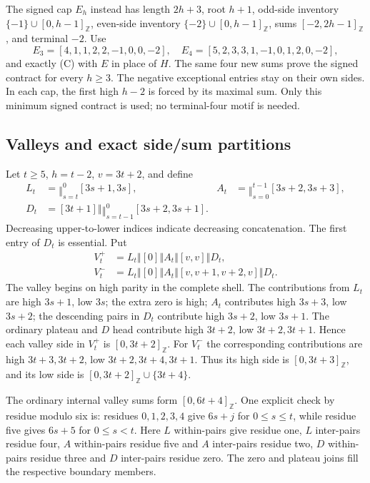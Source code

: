\documentclass[11pt,a4paper]{article}
\theoremstyle{definition}\newtheorem{definition}[theorem]{Definition}
\theoremstyle{remark}\newtheorem{remark}[theorem]{Remark}
\newcommand{\cat}{\mathbin{\Vert}}
\newcommand{\ints}[2]{[#1,#2]_{\mathbb Z}}
\begin{document}
The signed cap $E_h$ instead has length $2h+3$, root $h+1$, odd-side
inventory $\{-1\}\cup\ints0{h-1}$, even-side inventory
$\{-2\}\cup\ints0{h-1}$, sums $\ints{-2}{2h-1}$, and terminal $-2$.
Use
\[
 E_3=[4,1,1,2,2,-1,0,0,-2],\quad
 E_4=[5,2,3,3,1,-1,0,1,2,0,-2],
\]
and exactly (C) with $E$ in place of $H$. The same four new sums
prove the signed contract for every $h\ge3$. The negative exceptional
entries stay on their own sides. In each cap, the first high $h-2$ is
forced by its maximal sum. Only this minimum signed contract is used;
no terminal-four motif is needed.

\subsection{Valleys and exact side/sum partitions}
Let $t\ge5$, $h=t-2$, $v=3t+2$, and define
\begin{align*}
 L_t&=\mathop{\cat}_{s=t}^{0}[3s+1,3s],&
 A_t&=\mathop{\cat}_{s=0}^{t-1}[3s+2,3s+3],\\
 D_t&=[3t+1]\cat\mathop{\cat}_{s=t-1}^{0}[3s+2,3s+1].
\end{align*}
Decreasing upper-to-lower indices indicate decreasing concatenation.
The first entry of $D_t$ is essential. Put
\begin{align*}
 V_t^+&=L_t\cat[0]\cat A_t\cat[v,v]\cat D_t,\\
 V_t^-&=L_t\cat[0]\cat A_t\cat[v,v+1,v+2,v]\cat D_t.
\end{align*}
The valley begins on high parity in the complete shell. The contributions
from $L_t$ are high $3s+1$, low $3s$; the extra zero is high;
$A_t$ contributes high $3s+3$, low $3s+2$; the descending pairs
in $D_t$ contribute high $3s+2$, low $3s+1$.
The ordinary plateau and $D$ head contribute high $3t+2$, low
$3t+2,3t+1$. Hence each valley side in $V_t^+$ is $\ints0{3t+2}$.
For $V_t^-$ the corresponding contributions are high $3t+3,3t+2$,
low $3t+2,3t+4,3t+1$. Thus its high side is $\ints0{3t+3}$,
and its low side is $\ints0{3t+2}\cup\{3t+4\}$.

The ordinary internal valley sums form $\ints0{6t+4}$. One explicit
check by residue modulo six is: residues $0,1,2,3,4$ give $6s+j$ for
$0\le s\le t$, while residue five gives $6s+5$ for $0\le s<t$.
Here $L$ within-pairs give residue one, $L$ inter-pairs residue four,
$A$ within-pairs residue five and $A$ inter-pairs residue two,
$D$ within-pairs residue three and $D$ inter-pairs residue zero.
The zero and plateau joins fill the respective boundary members.
\end{document}
